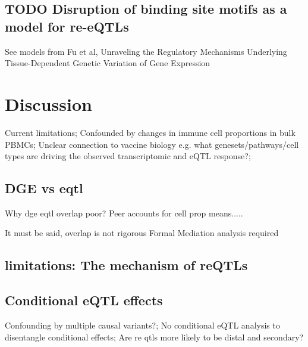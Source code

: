 \subsection{TODO Disruption of binding site motifs as a model for re-eQTLs}

See models from Fu et al, Unraveling the Regulatory Mechanisms Underlying Tissue-Dependent Genetic Variation of Gene Expression

\section{Discussion}

Current limitations;
Confounded by changes in immune cell proportions in bulk PBMCs;
Unclear connection to vaccine biology e.g. what genesets/pathways/cell types are driving the observed transcriptomic and eQTL response?;

\subsection{DGE vs eqtl}
Why dge eqtl overlap poor?
Peer accounts for cell prop means.....

It must be said, overlap is not rigorous
Formal Mediation analysis required

\subsection{limitations: The mechanism of reQTLs}

\subsection{Conditional eQTL effects}
Confounding by multiple causal variants?;
No conditional eQTL analysis to disentangle conditional effects;
Are re qtls more likely to be distal and secondary?

